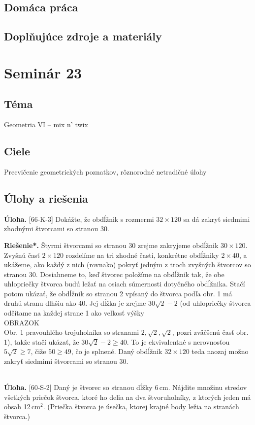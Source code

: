 \documentclass[11pt,a4paper,oneside,final]{book}
\newcommand{\ul}{\textbf{Úloha.} }
\newcommand{\rieh}{\textbf{Riešenie*.} }
\begin{document}
\subsection*{Domáca práca}

\subsection*{Doplňujúce zdroje a materiály}
\newpage
\section*{Seminár 23}
\subsection*{Téma}
Geometria VI -- mix n' twix
\subsection*{Ciele}
Precvičenie geometrických poznatkov, rôznorodné netradičné úlohy

\subsection*{Úlohy a riešenia}
\begin{tcolorbox}[breakable,notitle,boxrule=0pt,colback=light-gray,colframe=light-gray]\ul [66-K-3] Dokážte, že obdĺžnik s rozmermi $32 \times 120$ sa dá zakryť siedmimi zhodnými štvorcami so stranou 30.

\end{tcolorbox}

\rieh Štyrmi štvorcami so stranou 30 zrejme zakryjeme obdĺžnik $30\times 120$. Zvyšnú časť $2 \times 120$ rozdelíme na tri zhodné časti, konkrétne obdĺžniky $2 \times 40$, a ukážeme, ako každý z nich (rovnako) pokryť jedným z troch zvyšných štvorcov so stranou 30. Dosiahneme to, keď štvorec položíme na obdĺžnik tak, že obe uhlopriečky štvorca budú ležať na osiach súmernosti dotyčného obdĺžnika. Stačí potom ukázať, že obdĺžnik so stranou 2 vpísaný do štvorca podľa obr. 1 má druhú stranu dlhšiu ako 40. Jej dĺžka je zrejme $30\sqrt{2}-2$ (od uhlopriečky štvorca odčítame na každej strane 1 ako veľkosť výšky
\\
OBRAZOK
\\
Obr. 1
pravouhlého trojuholníka so stranami $2, \sqrt{2}, \sqrt{2}$, pozri zväčšenú časť obr. 1), takže stačí ukázať, že $30\sqrt{2}-2\geq 40$. To je ekvivalentné s nerovnosťou $5\sqrt{2}\geq 7$, čiže $50 \geq 49$, čo je splnené. Daný obdĺžnik $32 \times 120$ teda naozaj možno zakryť siedmimi štvorcami so stranou 30.\\
\\
\begin{tcolorbox}[breakable,notitle,boxrule=0pt,colback=light-gray,colframe=light-gray]\ul [60-S-2]  Daný je štvorec so stranou dĺžky 6\,cm. Nájdite množinu stredov všetkých priečok štvorca, ktoré ho delia na dva štvoruholníky, z ktorých jeden má obsah 12\,cm$^2$. (Priečka štvorca je úsečka, ktorej krajné body ležia na stranách štvorca.)

\end{tcolorbox}
\end{document}
